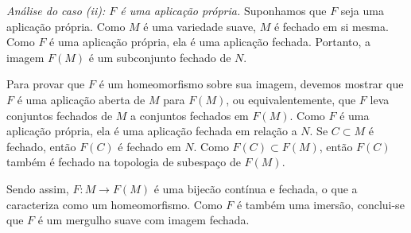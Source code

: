{	\textit{Análise do caso (ii): $F$ é uma aplicação própria.}
	Suponhamos que $F$ seja uma aplicação própria. Como $M$ é uma variedade suave, $M$ é fechado em si mesma. Como $F$ é uma aplicação própria, ela é uma aplicação fechada. Portanto, a imagem $F(M)$ é um subconjunto fechado de $N$.
	
	Para provar que $F$ é um homeomorfismo sobre sua imagem, devemos mostrar que $F$ é uma aplicação aberta de $M$ para $F(M)$, ou equivalentemente, que $F$ leva conjuntos fechados de $M$ a conjuntos fechados em $F(M)$. Como $F$ é uma aplicação própria, ela é uma aplicação fechada em relação a $N$. Se $C \subset M$ é fechado, então $F(C)$ é fechado em $N$. Como $F(C) \subset F(M)$, então $F(C)$ também é fechado na topologia de subespaço de $F(M)$.
	
	Sendo assim, $F : M \to F(M)$ é uma bijecão contínua e fechada, o que a caracteriza como um homeomorfismo. Como $F$ é também uma imersão, conclui-se que $F$ é um mergulho suave com imagem fechada.
}


